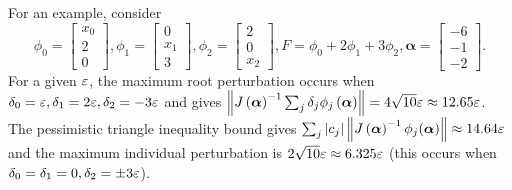 For an example, consider
\begin{equation}
\phi_0 = \left[ \begin{array}{c} x_0 \\ 2 \\ 0 \end{array}\right],
\phi_1 = \left[ \begin{array}{c} 0 \\ x_1 \\ 3 \end{array}\right],
\phi_2 = \left[ \begin{array}{c} 2 \\ 0 \\ x_2 \end{array}\right],
F = \phi_0 + 2 \phi_1 + 3 \phi_2,
\bm{\alpha} = \left[ \begin{array}{c} -6 \\ -1 \\ -2 \end{array}\right].
\end{equation}
For a given \(\varepsilon\), the maximum root perturbation occurs when
\(\delta_0 = \varepsilon, \delta_1 = 2 \varepsilon, \delta_2 = -3 \varepsilon\) and
gives
\(\left \lVert J\left(\bm{\alpha}\right)^{-1} \sum_j
\delta_j \phi_j\left(\bm{\alpha}\right) \right \rVert
= 4 \sqrt{10} \varepsilon \approx 12.65 \varepsilon\).
The pessimistic triangle inequality bound gives
\(\sum_j \left|c_j\right| \left \lVert J\left(\bm{\alpha}\right)^{-1}
\phi_j(\bm{\alpha})\right \rVert \approx 14.64 \varepsilon\) and the
maximum individual perturbation is \(2 \sqrt{10} \varepsilon \approx 6.325 \varepsilon\)
(this occurs when \(\delta_0 = \delta_1 = 0, \delta_2 = \pm 3 \varepsilon\)).

